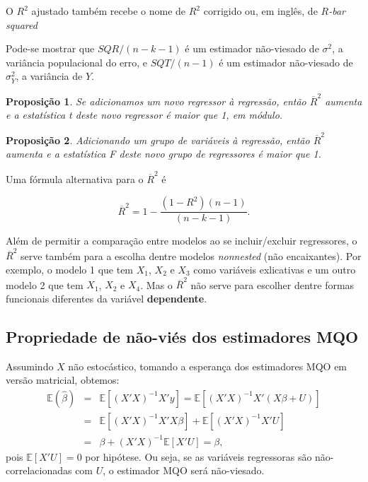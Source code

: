 \documentclass[
]{book}
\newtheorem{proposition}{Proposição}[chapter]
\theoremstyle{definition}
\theoremstyle{definition}
\theoremstyle{definition}
\theoremstyle{remark}
\begin{document}
O \(R^2\) ajustado também recebe o nome de \(R^2\) corrigido ou, em inglês, de \(R\)\emph{-bar squared}

Pode-se mostrar que \(SQR/(n-k-1)\) é um estimador não-viesado de \(\sigma^2\), a variância populacional do erro, e \(SQT/(n-1)\) é um estimador
não-viesado de \(\sigma^2_Y\), a variância de \(Y\).

\begin{proposition}
\protect\hypertarget{prp:prop1}{}{\label{prp:prop1} }Se adicionamos um novo regressor à regressão, então \(\overline{R}^2\) aumenta e a estatística t deste novo regressor é maior que 1, em módulo.
\end{proposition}

\begin{proposition}
\protect\hypertarget{prp:prop2}{}{\label{prp:prop2} }Adicionando um grupo de variáveis à regressão, então \(\overline{R}^2\) aumenta e a estatística F deste novo grupo de regressores é maior que 1.
\end{proposition}

Uma fórmula alternativa para o \(\overline{R}^2\) é

\[  \overline{R}^2 = 1-\frac{(1-R^2)(n-1)}{(n-k-1)}.\]

Além de permitir a comparação entre modelos ao se incluir/excluir regressores, o
\(\overline{R}^2\) serve também para a escolha dentre modelos \emph{nonnested} (não encaixantes). Por exemplo, o modelo 1 que tem \(X_1\), \(X_2\) e \(X_3\) como variáveis exlicativas e um outro modelo 2 que tem \(X_1\), \(X_2\) e \(X_4\). Mas o \(\overline{R}^2\) não serve para escolher dentre formas funcionais diferentes da variável \textbf{dependente}.

\hypertarget{propriedade-de-nuxe3o-viuxe9s-dos-estimadores-mqo}{%
\subsection{Propriedade de não-viés dos estimadores MQO}\label{propriedade-de-nuxe3o-viuxe9s-dos-estimadores-mqo}}

Assumindo \(X\) não estocástico, tomando a esperança dos estimadores MQO em versão matricial, obtemos:
\begin{eqnarray*}
\mathbb{E}(\hat{\beta})&=&\mathbb{E}[(X'X)^{-1}X'y]=\mathbb{E}[(X'X)^{-1}X'(X\beta+U)]\\
               &=&\mathbb{E}[(X'X)^{-1}X'X\beta]+\mathbb{E}[(X'X)^{-1}X'U]\\
               &=&\beta+(X'X)^{-1}\mathbb{E}[X'U]=\beta,
\end{eqnarray*}
pois \(\mathbb{E}[X'U]=0\) por hipótese. Ou seja, se as variáveis regressoras são não-correlacionadas com \(U\), o estimador MQO será não-viesado.
\end{document}
